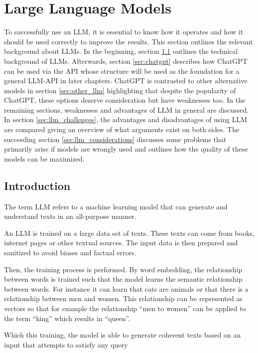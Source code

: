 \section{Large Language Models}\label{sec:llm}

To successfully use an \ac{LLM}, it is essential to know how it operates and how it should be used correctly to improve the results. This section outlines the relevant background about \acp{LLM}. In the beginning, section \ref{sec:llm_introduction} outlines the technical background of \acp{LLM}. Afterwards, section  \ref{sec:chatgpt}  describes how ChatGPT can be used via the \ac{API} whose structure will be used as the foundation for a general \ac{LLM}-\ac{API} in later chapters. ChatGPT is contrasted to other alternative models in section \ref{sec:other_llm} highlighting that despite the popularity of ChatGPT, these options deserve consideration but have weaknesses too. In the remaining sections, weaknesses and advantages of \ac{LLM} in general are discussed. In section \ref{sec:llm_challenges}, the advantages and disadvantages of using \ac{LLM} are compared giving an overview of what arguments exist on both sides. The succeeding section \ref{sec:llm_considerations} discusses some problems that primarily arise if models are wrongly used and outlines how the quality of these models can be maximized. 


\subsection{Introduction}\label{sec:llm_introduction}
The term \ac{LLM} refers to a machine learning model that can generate and understand texts in an all-purpose manner. 

An \ac{LLM} is trained on a large data set of texts. These texts can come from books, internet pages or other textual sources. The input data is then prepared and sanitized to avoid biases and factual errors.


Then, the training process is performed. By word embedding, the relationship between words is trained such that the model learns the semantic relationship between words. For instance it can learn that cats are animals  or that there is a relationship between men and women. This relationship can be represented as vectors so that for example the relationship \enquote{men to women} can be applied to the term \enquote{king} which results in \enquote{queen}.

Which this training, the model is able to generate coherent texts based on an input that attempts to satisfy any query



